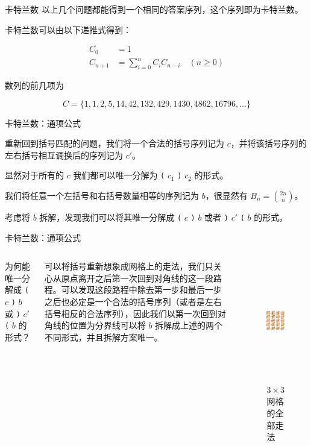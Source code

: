 \documentclass[12pt,aspectratio=169,handout]{beamer}
\begin{document}
\begin{frame}[fragile]{卡特兰数}
以上几个问题都能得到一个相同的答案序列，这个序列即为卡特兰数。

卡特兰数可以由以下递推式得到：

$$
\begin{aligned}
C_{0} &= 1 \\
C_{n+1} &= \sum_{i=0}^{n} C_{i} C_{n-i} \quad (n \ge 0)
\end{aligned}
$$

数列的前几项为

$$
C = \{1, 1, 2, 5, 14, 42, 132, 429, 1430, 4862, 16796, ...\}
$$
\end{frame}

\begin{frame}[fragile]{卡特兰数：通项公式}

重新回到括号匹配的问题，我们将一个合法的括号序列记为 $c$，并将该括号序列的左右括号相互调换后的序列记为 $c'$。

显然对于所有的 $c$ 我们都可以唯一分解为 \verb|(| $c_1$ \verb|)| $c_2$ 的形式。

我们将任意一个左括号和右括号数量相等的序列记为 $b$，很显然有 $B_{n} = {2n \choose n}$。

考虑将 $b$ 拆解，发现我们可以将其唯一分解成 \verb|(| $c$ \verb|)| $b$ 或者 \verb|)| $c'$ \verb|(| $b$ 的形式。
\end{frame}

\begin{frame}[fragile]{卡特兰数：通项公式}
  \begin{columns}[T]
      为何能唯一分解成 \verb|(| $c$ \verb|)| $b$ 或 \verb|)| $c'$ \verb|(| $b$ 的形式？

      \vspace{2em}

      可以将括号重新想象成网格上的走法，我们只关心从原点离开之后第一次回到对角线的这一段路程。可以发现这段路程中除去第一步和最后一步之后也必定是一个合法的括号序列（或者是左右括号相反的合法序列），因此我们以第一次回到对角线的位置为分界线可以将 $b$ 拆解成上述的两个不同形式，并且拆解方案唯一。
      \begin{figure}
        \centering
        \includegraphics[height=150pt]{full_walk.png}
        \caption{$3 \times 3$ 网格的全部走法}
      \end{figure}
  \end{columns}
\end{frame}
\end{document}
